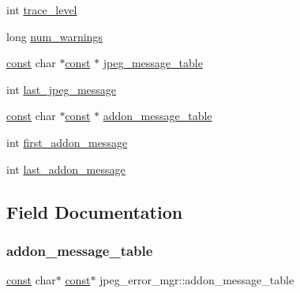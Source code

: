 \begin{DoxyCompactItemize}
\begin{tabbing}
\end{tabbing}\item 
int \hyperlink{structjpeg__error__mgr_a77328bf266cc3c3c4d9741fc27a4ef9b}{trace\+\_\+level}
\item 
long \hyperlink{structjpeg__error__mgr_a6d74f34ca06fd61c9cc2b5818d317255}{num\+\_\+warnings}
\item 
\hyperlink{zconf_8h_a2c212835823e3c54a8ab6d95c652660e}{const} char $\ast$\hyperlink{zconf_8h_a2c212835823e3c54a8ab6d95c652660e}{const}  $\ast$ \hyperlink{structjpeg__error__mgr_aeaa5c5dc26052bd7e367ceb35f670beb}{jpeg\+\_\+message\+\_\+table}
\item 
int \hyperlink{structjpeg__error__mgr_a01d4d8f17f2d2ad49e5bd981c01296b9}{last\+\_\+jpeg\+\_\+message}
\item 
\hyperlink{zconf_8h_a2c212835823e3c54a8ab6d95c652660e}{const} char $\ast$\hyperlink{zconf_8h_a2c212835823e3c54a8ab6d95c652660e}{const}  $\ast$ \hyperlink{structjpeg__error__mgr_af327179ad6b8d663a173e25615257e33}{addon\+\_\+message\+\_\+table}
\item 
int \hyperlink{structjpeg__error__mgr_a35a1536b1171bb13510b5156ffa0af05}{first\+\_\+addon\+\_\+message}
\item 
int \hyperlink{structjpeg__error__mgr_a67531ea98e366e64d5b348446d50e806}{last\+\_\+addon\+\_\+message}
\end{DoxyCompactItemize}


\subsection{Field Documentation}
\mbox{\label{structjpeg__error__mgr_af327179ad6b8d663a173e25615257e33}} 
\subsubsection{\texorpdfstring{addon\+\_\+message\+\_\+table}{addon\_message\_table}}
{\footnotesize\ttfamily \hyperlink{zconf_8h_a2c212835823e3c54a8ab6d95c652660e}{const} char$\ast$ \hyperlink{zconf_8h_a2c212835823e3c54a8ab6d95c652660e}{const}$\ast$ jpeg\+\_\+error\+\_\+mgr\+::addon\+\_\+message\+\_\+table}

\mbox{\label{structjpeg__error__mgr_ad1191212cf09f30ce06a648b04160790}} 
